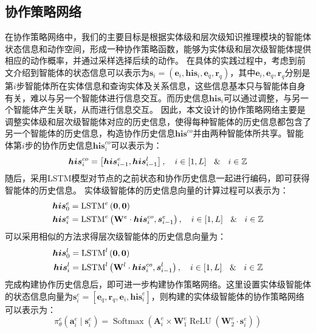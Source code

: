 \documentclass[algorithmlist, AutoFakeBold, AutoFakeSlant, figurelist, tablelist, nomlist, masters]{seuthesix}
\begin{document}
\subsection{协作策略网络}
在协作策略网络中，我们的主要目标是根据实体级和层次级知识推理模块的智能体状态信息和动作空间，形成一种协作策略函数，能够为实体级和层次级智能体提供相应的动作概率，并通过采样选择后续的动作。
在具体的实践过程中，考虑到前文介绍到智能体的状态信息可以表示为$\bm{s}_i = (\bm{e}_i, \bm{his}_i, \bm{e}_q, \bm{r}_q)$，其中$\bm{e}_i, \bm{e}_q, \bm{r}_q$分别是第$i$步智能体所在实体信息和查询实体及关系信息，这些信息基本只与智能体自身有关，难以与另一个智能体进行信息交互。而历史信息$\bm{his}_i$可以通过调整，与另一个智能体产生关联，从而进行信息交互。
因此，本文设计的协作策略网络主要是调整实体级和层次级智能体对应的历史信息，使得每种智能体的历史信息都包含了另一个智能体的历史信息，构造协作历史信息$\bm{his}^{co}$并由两种智能体所共享。智能体第$i$步的协作历史信息$\bm{his}_i^{co}$可以表示为：
\begin{equation}
  \bm{his}_{i}^{co} = \left[\bm{his}_{i-1}^e, \bm{his}_{i-1}^l\right], \quad i \in [1, L] \  \And \  i \in \mathbb{Z}
\end{equation}
随后，采用LSTM模型对节点的之前状态和协作历史信息一起进行编码，即可获得智能体的历史信息。
实体级智能体的历史信息向量的计算过程可以表示为：
\begin{equation}
  \begin{aligned}
    \bm{his}_0^e &= \operatorname{LSTM}^e\left(\bm{0}, \bm{0}\right) \\
    \bm{his}_i^e &= \operatorname{LSTM}^e\left(\mathbf{W}^e \cdot \bm{his}_i^{co}, \bm{s}_{i-1}^e\right),\quad i \in [1, L] \  \And \  i \in \mathbb{Z}
  \end{aligned}
\end{equation}
可以采用相似的方法求得层次级智能体的历史信息向量为：
\begin{equation}
  \begin{aligned}
    \bm{his}_0^l &=\operatorname{LSTM}^l\left(\bm{0}, \bm{0}\right) \\
    \bm{his}_i^l &= \operatorname{LSTM}^l\left(\mathbf{W}^l \cdot \bm{his}_i^{co}, \bm{s}_{i-1}^l\right),\quad i \in [1, L] \  \And \  i \in \mathbb{Z}
  \end{aligned}
\end{equation}
完成构建协作历史信息后，即可进一步构建协作策略网络。这里设置实体级智能体的状态信息向量为$\bm{s}_i^{e} = \left[\bm{e}_q, \bm{r}_q, \bm{e}_i, \bm{his}_i^e\right]$，则构建的实体级智能体的协作策略网络可以表示为：
\begin{equation}
  \pi_\theta^e\left(\bm{a}_i^e \mid \bm{s}_i^e\right) =\operatorname{Softmax}\left(\bm{A}_i^e \times \mathbf{W}_1^e \operatorname{ReLU}\left(\mathbf{W}_2^e \cdot \bm{s}_i^{e}\right)\right)
\end{equation}
\end{document}
